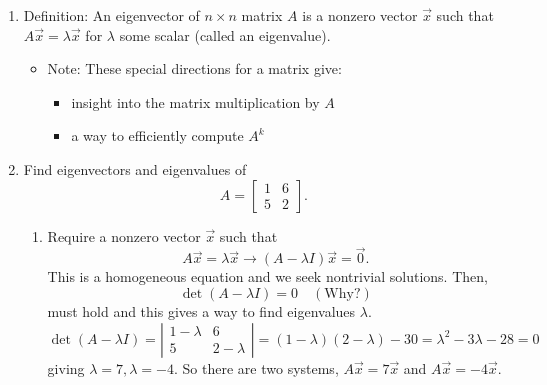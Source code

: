 \documentclass{article}
\begin{document}
\begin{enumerate}
\begin{enumerate}
\[\begin{array}{c}
3/7 \\ 4/7
\end{array}
\right]
\]
which agrees with our R calculation.
\item Observation: For matrix $P$, multiplication by nice vector $[3,7]^T$ results in just a scaling of the original vector. Graph in $x_1-x_2$ plan to illustrate. Entire line ($Span\{ \vec{x} \})$ also has this feature, but vectors not on this line do not.
\[
P \left[
\begin{array}{c}
1 \\ -2
\end{array}
\right]
 = 
\left[
\begin{array}{c}
0 \\ -1
\end{array}
\right]
\]
\end{enumerate}

\item Definition: An eigenvector of $n \times n$ matrix $A$ is a nonzero vector $\vec{x}$ such that $A\vec{x} = \lambda \vec{x}$ for $\lambda$ some scalar (called an eigenvalue). 
\begin{itemize}
\item Note: These special directions for a matrix give:
\begin{itemize}
\item insight into the matrix multiplication by $A$
\item a way to efficiently compute $A^k$
\end{itemize}
\end{itemize}

\item Find eigenvectors and eigenvalues of 
\[
A = \left[
\begin{array}{cc}
1 & 6 \\
5 & 2
\end{array}
\right].
\]
\begin{enumerate}
\item Require a nonzero vector $\vec{x}$ such that 
\[
A \vec{x} = \lambda \vec{x} \rightarrow (A-\lambda I) \vec{x} = \vec{0}.
\]
This is a homogeneous equation and we seek nontrivial solutions. Then,
\[
\det(A-\lambda I) = 0 \quad (\text{Why?})
\]
must hold and this gives a way to find eigenvalues $\lambda$.
\[
\det(A-\lambda I) = \left|
\begin{array}{cc}
1-\lambda & 6 \\
5 & 2-\lambda
\end{array}
\right|
= (1-\lambda)(2-\lambda) - 30 = \lambda^2-3\lambda - 28 = 0
\]
giving $\lambda = 7, \lambda = -4$. So there are two systems, $A\vec{x} = 7\vec{x}$ and $A\vec{x} = -4\vec{x}$.


\end{enumerate}
\end{enumerate}
\end{document}
